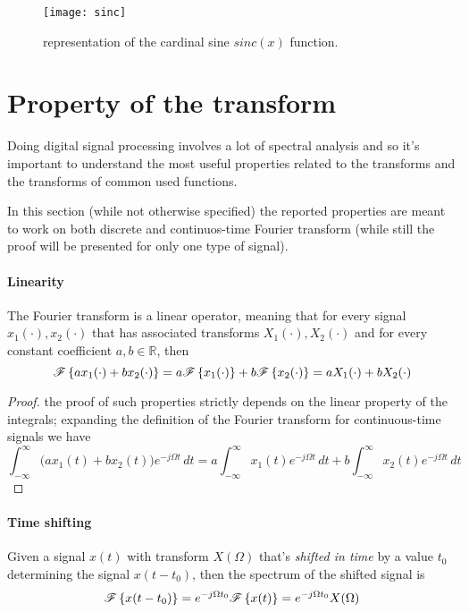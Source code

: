	\begin{SCfigure}[2][bt]
		\centering \texttt{[image: sinc]}
		\caption{representation of the cardinal sine $sinc(x)$ function.} \label{fig:four:sinc}
	\end{SCfigure}
	
\section{Property of the transform}
	Doing digital signal processing involves a lot of spectral analysis and so it's important to understand the most useful properties related to the transforms and the transforms of common used functions.
	
		In this section (while not otherwise specified) the reported properties are meant to work on both discrete and continuos-time Fourier transform (while still the proof will be presented for only one type of signal).
		
		\paragraph{Linearity} The Fourier transform is a linear operator, meaning that for every signal $x_1(\cdot),x_2(\cdot)$ that has associated transforms $X_1(\cdot),X_2(\cdot)$ and for every constant coefficient $a,b \in \mathds R$, then 
		\begin{equation}
			\mathscr{F}\left\{ ax_1(\cdot) + b x_2(\cdot) \right\} = a \mathscr{F}\left\{ x_1(\cdot) \right\} + b\mathscr{F}\left\{ x_2(\cdot) \right\} = a X_1(\cdot) + bX_2(\cdot)
		\end{equation}
		
		\begin{proof}
			the proof of such properties strictly depends on the linear property of the integrals; expanding the definition of the Fourier transform for continuous-time signals we have
			\[ \int_{-\infty}^\infty \Big(a x_1 (t) + bx_2(t)\Big) e ^{-j\Omega t} \, dt = a \int_{-\infty}^\infty x_1 (t)  e ^{-j\Omega t} \, dt + b \int_{-\infty}^\infty x_2 (t)  e ^{-j\Omega t} \, dt  \]
		\end{proof}
		
		\paragraph{Time shifting} Given a signal $x(t)$ with transform $X(\Omega)$ that's \textit{shifted in time} by a value $t_0$ determining the signal $x(t-t_0)$, then the spectrum of the shifted signal is
		\begin{equation} \label{eq:four:timeshifting}
			\mathscr{F}\left\{ x(t-t_0) \right\} = e^{-j\Omega t_0} \mathscr{F}\left\{ x(t) \right\} = e^{-j\Omega t_0} X(\Omega)
		\end{equation}
		
